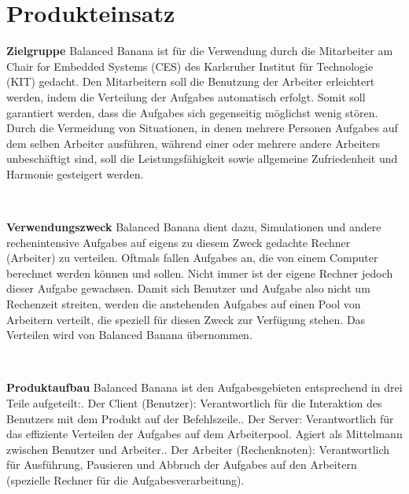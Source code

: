 \documentclass[a4paper,12pt]{article}
\begin{document}
\section{Produkteinsatz}
\begin{itemize}
\begin{minipage}[t]{\linewidth}
\item \textbf{Zielgruppe}\newline
Balanced Banana ist für die Verwendung durch die Mitarbeiter am Chair for Embedded Systems (CES) des Karlsruher Institut für Technologie (KIT) gedacht.\newline
Den Mitarbeitern soll die Benutzung der \gls{Arbeiter} erleichtert werden, indem die Verteilung der \glspl{Aufgabe} automatisch erfolgt. Somit soll garantiert werden, dass die \glspl{Aufgabe} sich gegenseitig möglichst wenig stören.\newline
Durch die Vermeidung von Situationen, in denen mehrere Personen \glspl{Aufgabe} auf dem selben \gls{Arbeiter} ausführen, während einer oder mehrere andere \glspl{Arbeiter} unbeschäftigt sind, soll die Leistungsfähigkeit sowie allgemeine Zufriedenheit und Harmonie gesteigert werden.
\end{minipage}
\\

\begin{minipage}[t]{\linewidth}
\item \textbf{Verwendungszweck}\newline
Balanced Banana dient dazu, Simulationen und andere rechenintensive \glspl{Aufgabe} auf eigens zu diesem Zweck gedachte Rechner (\gls{Arbeiter}) zu verteilen.\newline
Oftmals fallen \glspl{Aufgabe} an, die von einem Computer berechnet werden können und sollen. Nicht immer ist der eigene Rechner jedoch dieser \gls{Aufgabe} gewachsen. Damit sich \gls{Benutzer} und \gls{Aufgabe} also nicht um Rechenzeit streiten, werden die anstehenden \glspl{Aufgabe} auf einen Pool von Arbeitern verteilt, die speziell für diesen Zweck zur Verfügung stehen. Das Verteilen wird von Balanced Banana übernommen.
\end{minipage}
\\

\begin{minipage}[t]{\linewidth}
\item \textbf{Produktaufbau}\newline
Balanced Banana ist den \glspl{Aufgabe}gebieten entsprechend in drei Teile aufgeteilt:. Der \gls{Client} (\gls{Benutzer}): Verantwortlich für die Interaktion des \gls{Benutzer}s mit dem Produkt auf der \gls{Befehlszeile}.. Der \gls{Server}: Verantwortlich für das effiziente Verteilen der \glspl{Aufgabe} auf dem Arbeiterpool. Agiert als Mittelmann zwischen \gls{Benutzer} und \gls{Arbeiter}.. Der \gls{Arbeiter} (Rechenknoten): Verantwortlich für Ausführung, Pausieren und Abbruch der \glspl{Aufgabe} auf den Arbeitern (spezielle Rechner für die \glspl{Aufgabe}verarbeitung).
\end{minipage}
\end{itemize}
\newpage
\end{document}
